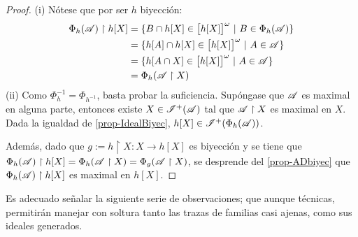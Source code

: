 \begin{proof}
	(i) Nótese que por ser $h$ biyección:
	\begin{align*}
		\Phi_h(\mathscr{A}) \upharpoonright h[X] & = \{ B \cap h[X] \in \big[ h[X] \big]^\omega \text{ $|$ } B \in \Phi_h(\mathscr{A}) \} \\
		                                    & = \{ h[A] \cap h[X] \in \big[ h[X] \big]^\omega \text{ $|$ } A \in \mathscr{A} \}      \\
		                                    & = \{ h[A \cap X] \in \big[ h[X] \big]^\omega \text{ $|$ } A \in \mathscr{A} \}         \\
		                                    & = \Phi_h (\mathscr{A} \upharpoonright X)
	\end{align*}
	(ii) Como $\Phi_h ^{-1} = \Phi_{h^{-1}}$, basta probar la suficiencia. Supóngase que $\mathscr{A}$ es maximal en alguna parte, entonces existe $X \in \mathscr{I}^+(\mathscr{A})$ tal que $\mathscr{A} \upharpoonright X$ es maximal en $X$. Dada la igualdad de \ref{prop-IdealBiyec}, $h[X] \in \mathscr{I}^+(\Phi_h(\mathscr{A}))$.

	Además, dado que $g:= h \upharpoonright X : X \to h[X]$ es biyección y se tiene que $\Phi_h(\mathscr{A}) \upharpoonright h[X]=\Phi_h (\mathscr{A} \upharpoonright X)=\Phi_g (\mathscr{A} \upharpoonright X)$, se desprende del \autoref{prop-ADbiyec} que $\Phi_h(\mathscr{A}) \upharpoonright h[X]$ es maximal en $h[X]$.
\end{proof}

Es adecuado señalar la siguiente serie de observaciones; que aunque técnicas, permitirán manejar con soltura tanto las trazas de familias casi ajenas, como sus ideales generados.

